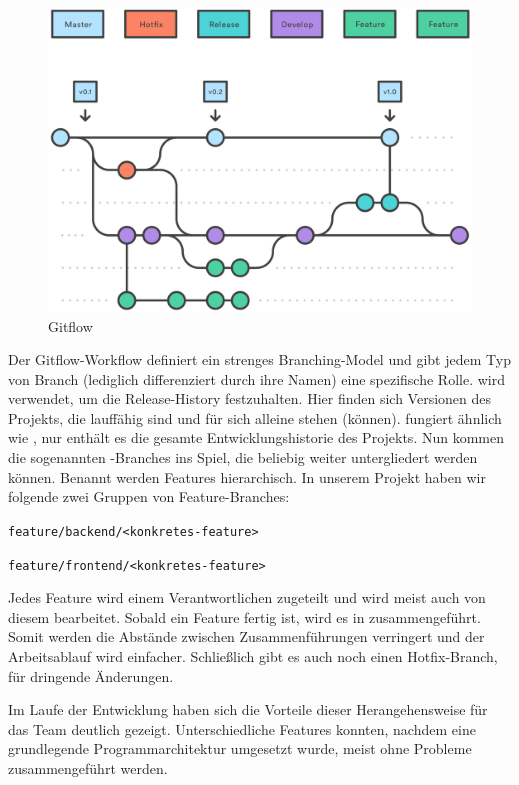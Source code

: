 \begin{figure}[h]
	\includegraphics[width=\columnwidth]{img/gitflow}
	\caption[Gitflow]{Gitflow\footnotemark}
\end{figure}

Der Gitflow-Workflow definiert ein strenges Branching-Model und gibt jedem Typ von Branch (lediglich differenziert durch ihre Namen) eine spezifische Rolle.  wird verwendet, um die Release-History festzuhalten. Hier finden sich Versionen des Projekts, die lauffähig sind und für sich alleine stehen (können).  fungiert ähnlich wie , nur enthält es die gesamte Entwicklungshistorie des Projekts. Nun kommen die sogenannten -Branches ins Spiel, die beliebig weiter untergliedert werden können. Benannt werden Features hierarchisch. In unserem Projekt haben wir folgende zwei Gruppen von Feature-Branches: 

\texttt{feature/backend/<konkretes-feature>}

\texttt{feature/frontend/<konkretes-feature>}

Jedes Feature wird einem Verantwortlichen zugeteilt und wird meist auch von diesem bearbeitet. Sobald ein Feature fertig ist, wird es in  zusammengeführt. Somit werden die Abstände zwischen Zusammenführungen verringert und der Arbeitsablauf wird einfacher. Schließlich gibt es auch noch einen Hotfix-Branch, für dringende Änderungen.

Im Laufe der Entwicklung haben sich die Vorteile dieser Herangehensweise für das Team deutlich gezeigt. Unterschiedliche Features konnten, nachdem eine grundlegende Programmarchitektur umgesetzt wurde, meist ohne Probleme zusammengeführt werden. 